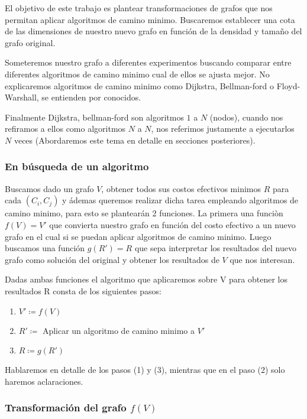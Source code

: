 \documentclass[12pt]{article}
\def\is{\coloneqq}
\begin{document}
El objetivo de este trabajo es plantear transformaciones de grafos que nos permitan aplicar algoritmos de camino minimo. Buscaremos establecer una cota de las dimensiones de nuestro nuevo grafo en función de la densidad y tamaño del grafo original.

Someteremos nuestro grafo a diferentes experimentos buscando comparar entre diferentes algoritmos de camino minimo cual de ellos se ajusta mejor. No explicaremos algoritmos de camino minimo como Dijkstra, Bellman-ford o Floyd-Warshall, se entienden por conocidos.

Finalmente Dijkstra, bellman-ford son algoritmos $1$ a $N$ (nodos), cuando nos refiramos a ellos como algoritmos $N$ a $N$, nos referimos justamente a ejecutarlos $N$ veces (Abordaremos este tema en detalle en secciones posteriores).

\subsubsection{En búsqueda de un algoritmo}

Buscamos dado un grafo $V$, obtener todos sus costos efectivos minimos $R$ para cada $(C_i, C_j)$ y ádemas queremos realizar dicha tarea empleando algoritmos de camino minimo, para esto se plantearán 2 funciones. La primera una funciòn $f(V) = V'$ que convierta nuestro grafo en función del costo efectivo a un nuevo grafo en el cual si se puedan aplicar algoritmos de camino minimo. Luego buscamos una función $g(R') = R$ que sepa interpretar los resultados del nuevo grafo como solución del original y obtener los resultados de $V$ que nos interesan.

Dadas ambas funciones el algoritmo que aplicaremos sobre V para obtener los resultados R consta de los siguientes pasos:

\begin{enumerate}
	\item $V' \is f(V)$
	\item $R' \is$ Aplicar un algoritmo de camino minimo a $V'$
	\item $R \is g(R')$
\end{enumerate}

Hablaremos en detalle de los pasos (1) y (3), mientras que en el paso (2) solo haremos aclaraciones.

\subsubsection{Transformación del grafo $f(V)$}
\end{document}
